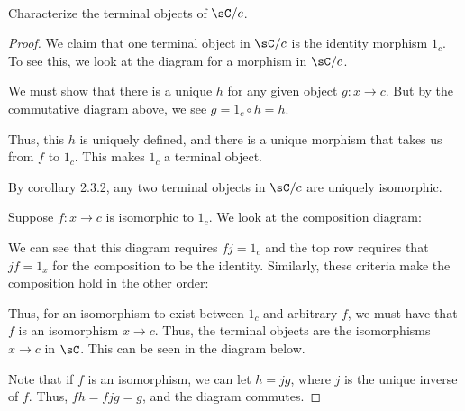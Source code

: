 \documentclass[../../main]{subfiles}
\begin{document}
\paragraph{}

\begin{exercise}
	Characterize the terminal objects of $\sC/c$.
\end{exercise}

\begin{proof}
We claim that one terminal object in $\sC/c$ is the identity morphism $1_c$.
To see this, we look at the diagram for a morphism in $\sC/c$.


We must show that there is a unique $h$ for any given object $g\colon x \rightarrow c$.  But by the commutative diagram above, we see $g = 1_c \circ h = h$.

Thus, this $h$ is uniquely defined, and there is a unique morphism that takes us from $f$ to $1_c$. This makes $1_c$ a terminal object.

 By corollary 2.3.2, any two terminal objects in $\sC/c$ are uniquely isomorphic.  

Suppose $f\colon x\rightarrow c$ is isomorphic to $1_c$.  We look at the composition diagram:


We can see that this diagram requires $fj = 1_c$ and the top row requires that $jf = 1_x$ for the composition to be the identity.  Similarly, these criteria make the composition hold in the other order:


Thus, for an isomorphism to exist between $1_c$ and arbitrary $f$, we must have
that $f$ is an isomorphism $x \rightarrow c$.  Thus, the terminal objects are
the isomorphisms $x \rightarrow c$ in $\sC$.  This can be seen in the diagram
below.


Note that if $f$ is an isomorphism, we can let $h = jg$, where $j$ is the unique inverse of $f$.  Thus, $fh = fjg = g$, and the diagram commutes.
\end{proof}
\end{document}
